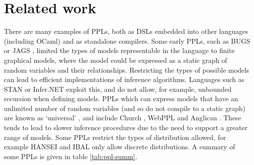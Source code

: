 \section{Related work}
There are many examples of PPLs, both as DSLs embedded into other languages (including OCaml) and as standalone compilers. Some early PPLs, such as BUGS \cite{gilks1994bugs} or JAGS \cite{plummer2004jags}, limited the types of models representable in the language to finite graphical models, where the model could be expressed as a static graph of random variables and their relationships. Restricting the types of possible models can lead to efficient implementations of inference algorithms. Languages such as STAN \cite{carpenter2017stan} or Infer.NET \cite{wang2011using} exploit this, and do not allow, for example, unbounded recursion when defining models. PPLs which can express models that have an unlimited number of random variables (and so do not compile to a static graph) are known as `universal' \cite{borgstrom2016lambda}, and include Church \cite{goodman2012church}, WebPPL \cite{mobus2018structure} and Anglican \cite{anglican-smc}. These tends to lead to slower inference procedures due to the need to support a greater range of models. Some PPLs restrict the types of distribution allowed, for example HANSEI \cite{kiselyov2009embedded} and IBAL \cite{ibal} only allow discrete distributions. A summary of some PPLs is given in table \ref{tab:ppl-summ}.

